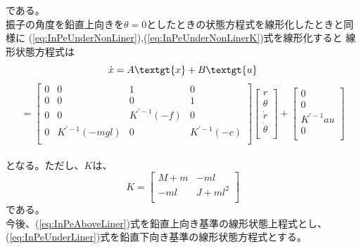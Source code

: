 	である。\\
	振子の角度を鉛直上向きを$\theta=0$としたときの状態方程式を線形化したときと同様に
	(\ref{eq:InPeUnderNonLiner}),(\ref{eq:InPeUnderNonLinerK})式を線形化すると
	線形状態方程式は\\
	\[\dot{x}=A\textgt{x}+B\textgt{u}\]
	\begin{equation}
		=\left[
		\begin{array}{cccc}
			0 & 0 & 1 & 0 \\
			0 & 0 & 0 & 1 \\
			0 & 0 & K^{'-1}(-f) & 0 \\
			0 & K^{'-1}(-mgl) & 0 & K^{'-1}(-c)\\
		\end{array}
		\right]
		\left[
		\begin{array}{c}
			r\\
			\theta\\
			\dot{r}\\
			\dot{\theta}\\
		\end{array}
		\right] + 
		\left[
		\begin{array}{c}
			0\\
			0\\
			K^{'-1}au\\
			0\\
		\end{array}
		\right]
		\label{eq:InPeUnderLiner}
	\end{equation}
	\\
	となる。ただし、$K$は、
	\begin{equation}
		K=\left[
		\begin{array}{ccc}
			M+m & -ml\\
			-ml & J+ml^{2}\\
		\end{array}
		\right]
	\end{equation}
	である。\\
	今後、(\ref{eq:InPeAboveLiner})式を鉛直上向き基準の線形状態上程式とし、
	(\ref{eq:InPeUnderLiner})式を鉛直下向き基準の線形状態方程式とする。
	
